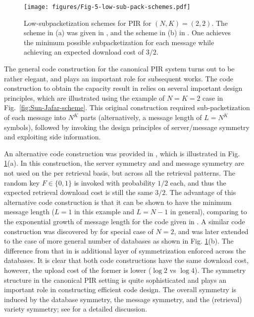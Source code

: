 \begin{figure}[t]
\centering
\vspace{0.2cm}
\texttt{[image: figures/Fig-5-low-sub-pack-schemes.pdf]}
\caption{Low-subpacketization schemes for PIR for $(N,K)=(2,2)$. The scheme in (a) was given in \cite{tian2018capacity_ICC,tian2019capacity}, and the scheme in (b) in \cite{Samy_tandon_lazos_leakyPIR_2019, asymmetric_leaky_PIR-2021}. One achieves the minimum possible subpacketization for each message while achieving an expected download cost of $3/2$.}
\label{fig:low-sub-pack-PIR}
\end{figure}

The general code construction for the canonical PIR system turns out to be rather elegant, and plays an important role for subsequent works. The code construction to obtain the capacity result in \cite{sun2017PIRcapacity} relies on several important design principles, which are illustrated using the example of $N=K=2$ case in Fig.~\ref{fig:Sun-Jafar-scheme}. This original construction required sub-packetization of each message into $N^{K}$ parts (alternatively, a message length of $L=N^{K}$ symbols), followed by invoking the design principles of server/message symmetry and exploiting side information. 

An alternative code construction was provided in \cite{tian2018capacity_ICC,tian2019capacity}, which is illustrated in Fig. \ref{fig:low-sub-pack-PIR}(a). In this construction, the server symmetry and and message symmetry are not used on the per retrieval basis, but across all the retrieval patterns. The random key $F\in\{0,1\}$ is invoked with probability $1/2$ each, and thus the expected retrieval download cost is still the same $3/2$. The advantage of this alternative code construction is that it can be shown to have the minimum message length ($L=1$ in this example and $L=N-1$ in general), comparing to the exponential growth of message length for the code given in \cite{sun2017PIRcapacity}. A similar code construction was discovered by \cite{Samy_tandon_lazos_leakyPIR_2019} for special case of $N=2$, and was later extended to the  case of more general number of databases \cite{asymmetric_leaky_PIR-2021} as shown in Fig. \ref{fig:low-sub-pack-PIR}(b). The difference from that in  \cite{tian2018capacity_ICC,tian2019capacity} is additional layer of symmetrization enforced across the databases.  It is clear that both code constructions have the same download cost, however, the upload cost of the former is lower ($\log 2$ vs $\log 4$). The symmetry structure in the canonical PIR setting is quite sophisticated and plays an important role in constructing efficient code design. The overall symmetry is induced by the database symmetry, the message symmetry, and the (retrieval) variety symmetry; see \cite{tian2019capacity} for a detailed discussion.

